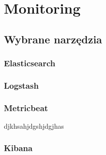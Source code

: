 \chapter{Monitoring}

\section{ Wybrane narzędzia }
\subsection{ Elasticsearch }
\subsection{ Logstash }
\subsection{ Metricbeat }
djkhsahjdgshjdgjhas
\subsection{ Kibana }